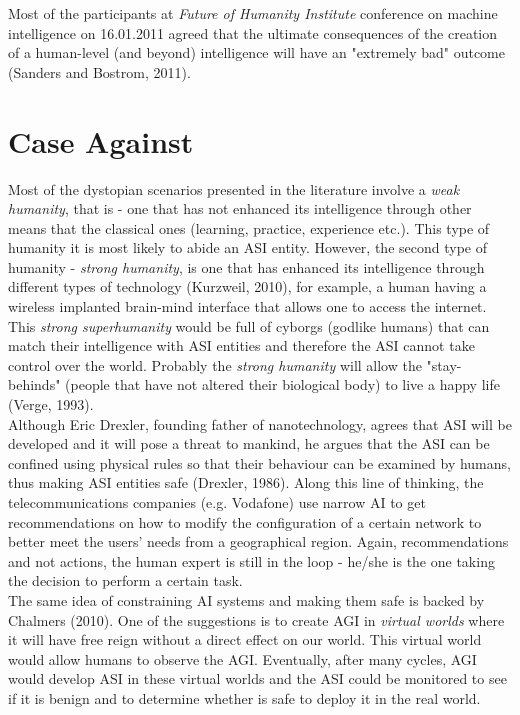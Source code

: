 \documentclass[11pt]{article}
\begin{document}
	\indent
	Most of the participants at \textit{Future of Humanity Institute} conference on machine intelligence on 16.01.2011 agreed that the ultimate consequences of the creation of a human-level (and beyond) intelligence will have an "extremely bad" outcome (Sanders and Bostrom, 2011).



\section*{Case Against}
	Most of the dystopian scenarios presented in the literature involve a \textit{weak humanity}, that is - one that has not enhanced its intelligence through other means that the classical ones (learning, practice, experience etc.). This type of humanity it is most likely to abide an ASI entity. However, the second type of humanity - \textit{strong humanity}, is one that has enhanced its intelligence through different types of technology (Kurzweil, 2010), for example, a human having a wireless implanted brain-mind interface that allows one to access the internet. This \textit{strong superhumanity} would be full of cyborgs (godlike humans) that can match their intelligence with ASI entities and therefore the ASI cannot take control over the world. Probably the \textit{strong humanity} will allow the  "stay-behinds" (people that have not altered their biological body) to live a happy life (Verge, 1993). \\

	\indent
Although Eric Drexler, founding father of nanotechnology, agrees that ASI will be developed and it will pose a threat to mankind, he argues that the ASI can be confined using physical rules so that their behaviour can be examined by humans, thus making ASI entities safe (Drexler, 1986). Along this line of thinking, the telecommunications companies (e.g. Vodafone) use narrow AI to get recommendations on how to modify the configuration of a certain network to better meet the users' needs from a geographical region. Again, recommendations and not actions, the human expert is still in the loop - he/she is the one taking the decision to perform a certain task.\\ 

	\indent
The same idea of constraining AI systems and making them safe is backed by Chalmers (2010). One of the suggestions is to create AGI in \textit{virtual worlds} where it will have free reign without a direct effect on our world. This virtual world would allow humans to observe the AGI. Eventually, after many cycles, AGI would develop ASI in these virtual worlds and the ASI could be monitored to see if it is benign and to determine whether is safe to deploy it in the real world.\\
  
\end{document}
